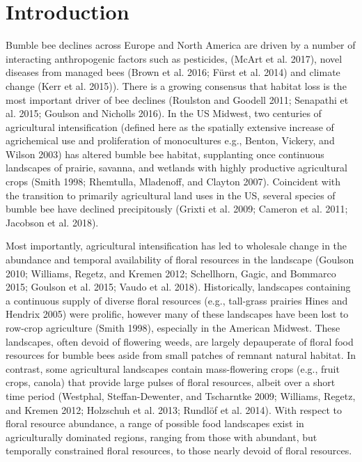 \documentclass[11pt,]{article}
\title{}
\author{}
\date{}
\begin{document}
\hypertarget{introduction}{%
\section{Introduction}\label{introduction}}

Bumble bee declines across Europe and North America are driven by a
number of interacting anthropogenic factors such as pesticides, (McArt
et al. 2017), novel diseases from managed bees (Brown et al. 2016; Fürst
et al. 2014) and climate change (Kerr et al. 2015)). There is a growing
consensus that habitat loss is the most important driver of bee declines
(Roulston and Goodell 2011; Senapathi et al. 2015; Goulson and Nicholls
2016). In the US Midwest, two centuries of agricultural intensification
(defined here as the spatially extensive increase of agrichemical use
and proliferation of monocultures e.g., Benton, Vickery, and Wilson
2003) has altered bumble bee habitat, supplanting once continuous
landscapes of prairie, savanna, and wetlands with highly productive
agricultural crops (Smith 1998; Rhemtulla, Mladenoff, and Clayton 2007).
Coincident with the transition to primarily agricultural land uses in
the US, several species of bumble bee have declined precipitously
(Grixti et al. 2009; Cameron et al. 2011; Jacobson et al. 2018).

Most importantly, agricultural intensification has led to wholesale
change in the abundance and temporal availability of floral resources in
the landscape (Goulson 2010; Williams, Regetz, and Kremen 2012;
Schellhorn, Gagic, and Bommarco 2015; Goulson et al. 2015; Vaudo et al.
2018). Historically, landscapes containing a continuous supply of
diverse floral resources (e.g., tall-grass prairies Hines and Hendrix
2005) were prolific, however many of these landscapes have been lost to
row-crop agriculture (Smith 1998), especially in the American Midwest.
These landscapes, often devoid of flowering weeds, are largely
depauperate of floral food resources for bumble bees aside from small
patches of remnant natural habitat. In contrast, some agricultural
landscapes contain mass-flowering crops (e.g., fruit crops, canola) that
provide large pulses of floral resources, albeit over a short time
period (Westphal, Steffan-Dewenter, and Tscharntke 2009; Williams,
Regetz, and Kremen 2012; Holzschuh et al. 2013; Rundlöf et al. 2014).
With respect to floral resource abundance, a range of possible food
landscapes exist in agriculturally dominated regions, ranging from those
with abundant, but temporally constrained floral resources, to those
nearly devoid of floral resources.
\end{document}
